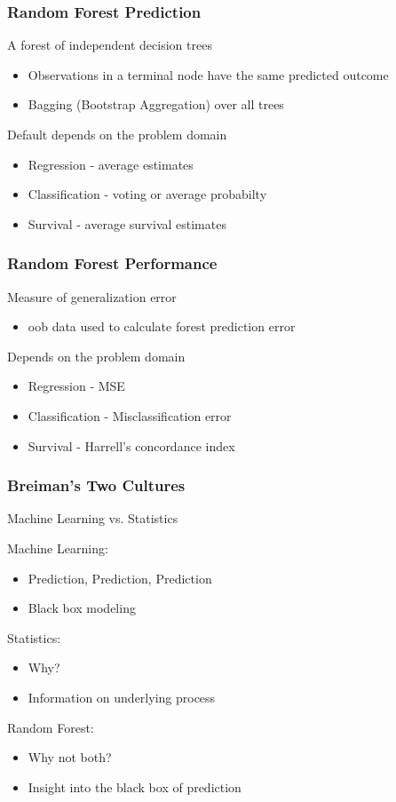 \documentclass[xcolor=svgnames]{beamer}\usepackage[]{graphicx}\usepackage[]{color}
\begin{document}
\begin{frame}
\frametitle{Random Forest Prediction}

A forest of independent decision trees

\begin{itemize}
\item Observations in a terminal node have the same predicted outcome
\item Bagging (Bootstrap Aggregation) over all trees
\end{itemize}

Default depends on the problem domain

\begin{itemize}
\item Regression - average estimates
\item Classification - voting or average probabilty
\item Survival - average survival estimates
\end{itemize}

\end{frame}
\begin{frame}
\frametitle{Random Forest Performance}

Measure of generalization error

\begin{itemize}
\item oob data used to calculate forest prediction error
\end{itemize}
Depends on the problem domain
\begin{itemize}
\item Regression - MSE
\item Classification - Misclassification error
\item Survival - Harrell's concordance index
\end{itemize}
\end{frame}
\begin{frame}
\frametitle{Breiman's Two Cultures}

Machine Learning vs. Statistics

Machine Learning:

\begin{itemize}
\item Prediction, Prediction, Prediction
\item Black box modeling
\end{itemize}

Statistics:
\begin{itemize}
\item Why?
\item Information on underlying process
\end{itemize}

Random Forest:

\begin{itemize}
\item Why not both?
\item Insight into the black box of prediction
\end{itemize}
\end{frame}
\end{document}

